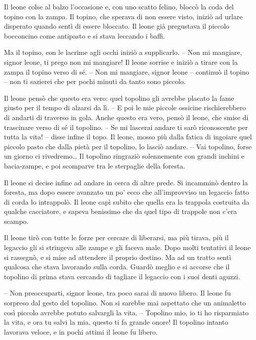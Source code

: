 \documentclass[12pt, a4paper]{article}
\begin{document}
Il leone colse al balzo l’occasione e, con uno scatto felino, bloccò la coda del topino con la zampa.
Il topino, che sperava di non essere visto, iniziò ad urlare disperato quando sentì di essere bloccato.
Il leone già pregustava il piccolo bocconcino come antipasto e si stava leccando i baffi.

Ma il topino, con le lacrime agli occhi iniziò a supplicarlo.
– Non mi mangiare, signor leone, ti prego non mi mangiare!
Il leone sorrise e iniziò a tirare con la zampa il topino verso di sé.
– Non mi mangiare, signor leone – continuò il topino – non ti sazierei che per pochi minuti da tanto sono piccolo.

Il leone pensò che questo era vero: quel topolino gli avrebbe placato la fame giusto per il tempo di alzarsi da lì.
– E poi le mie piccole ossicine rischierebbero di andarti di traverso in gola.
Anche questo era vero, pensò il leone, che smise di trascinare verso di sé il topolino.
– Se mi lascerai andare ti sarò riconoscente per tutta la vita! – disse infine il topo.
Il leone, mosso più dalla fatica di ingoiare quel piccolo pasto che dalla pietà per il topolino, lo lasciò andare.
– Vai topolino, forse un giorno ci rivedremo…
Il topolino ringraziò solennemente con grandi inchini e bacia-zampe, e poi scomparve tra le sterpaglie della foresta.

Il leone si decise infine ad andare in cerca di altre prede. Si incamminò dentro la foresta, ma dopo essere avanzato un po’ ecco che all’improvviso un legaccio fatto di corda lo intrappolò.
Il leone capì subito che quella era la trappola costruita da qualche cacciatore, e sapeva benissimo che da quel tipo di trappole non c’era scampo.

Il leone tirò con tutte le forze per cercare di liberarsi, ma più tirava, più il legaccio gli si stringeva alle zampe e gli faceva male. Dopo molti tentativi il leone si rassegnò, e si mise ad attendere il proprio destino.
Ma ad un tratto sentì qualcosa che stava lavorando sulla corda.
Guardò meglio e si accorse che il topolino di prima stava cercando di tagliare il legaccio con i suoi denti aguzzi.

– Non preoccuparti, signor leone, tra poco sarai di nuovo libero.
Il leone fu sorpreso dal gesto del topolino. Non si sarebbe mai aspettato che un animaletto così piccolo avrebbe potuto salvargli la vita.
– Topolino mio, io ti ho risparmiato la vita, e ora tu salvi la mia, questo ti fa grande onore!
Il topolino intanto lavorava veloce, e in pochi attimi il leone fu libero.
\end{document}
